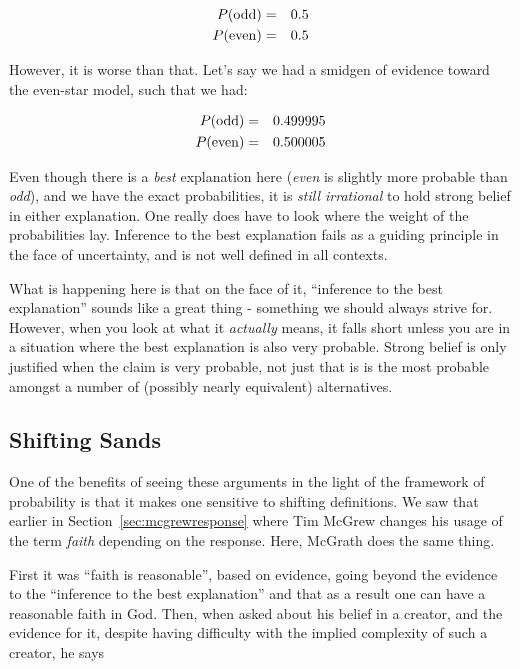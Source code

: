 \begin{eqnarray*}
P({\rm odd}) &=&0.5 \\
P({\rm even})&=&0.5
\end{eqnarray*}

However, it is worse than that. Let's say we had a smidgen of evidence
toward the even-star model, such that we had:

\begin{eqnarray*}
P({\rm odd}) &=&0.499995 \\
P({\rm even})&=&0.500005
\end{eqnarray*}

Even though there is a \emph{best} explanation here (\emph{even} is
slightly more probable than \emph{odd}), and we have the exact
probabilities, it is \emph{still irrational} to hold strong belief in
either explanation. One really does have to look where the weight of the
probabilities lay. Inference to the best explanation fails as a guiding
principle in the face of uncertainty, and is not well defined in all
contexts. 

What is happening here is that on the face of it, ``inference to the best explanation'' sounds like a great thing - something we should always strive for.  However, when you look at what it {\em actually} means, it falls short unless you are in a situation where the best explanation is also very probable.  Strong belief is only justified when the claim is very probable, not just that is is the most probable amongst a number of (possibly nearly equivalent) alternatives.


\subsection{Shifting Sands}\label{playing-dodgeball-with-an-apologist}

One of the benefits of seeing these arguments in the light of the framework of probability is that it makes one sensitive to shifting definitions.  We saw that earlier in Section~\ref{sec:mcgrewresponse} where Tim McGrew changes his usage of the term {\em faith} depending on the response.  Here, McGrath does the same thing.

First it was ``faith is reasonable'', based on evidence, going beyond the evidence to the ``inference to the best explanation'' and that as a result one can have a reasonable faith in God.  Then, when asked about his belief in a creator, and the evidence for it,  despite having difficulty with the implied complexity of such a creator, he says

